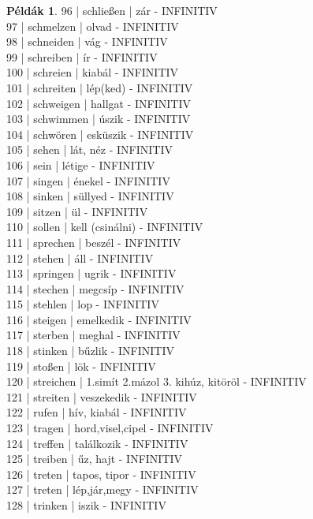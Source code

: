 \documentclass{article}
\theoremstyle{definition}
\newtheorem*{exmp}{Példák}
\begin{document}
\begin{exmp}
96 | schließen | zár - INFINITIV\\
97 | schmelzen | olvad - INFINITIV\\
98 | schneiden | vág - INFINITIV\\
99 | schreiben | ír - INFINITIV\\
100 | schreien | kiabál - INFINITIV\\
101 | schreiten | lép(ked) - INFINITIV\\
102 | schweigen | hallgat - INFINITIV\\
103 | schwimmen | úszik - INFINITIV\\
104 | schwören | esküszik - INFINITIV\\
105 | sehen | lát, néz - INFINITIV\\
106 | sein | létige - INFINITIV\\
107 | singen | énekel - INFINITIV\\
108 | sinken | süllyed - INFINITIV\\
109 | sitzen | ül - INFINITIV\\
110 | sollen | kell (csinálni) - INFINITIV\\
111 | sprechen | beszél - INFINITIV\\
112 | stehen | áll - INFINITIV\\
113 | springen | ugrik - INFINITIV\\
114 | stechen | megcsíp - INFINITIV\\
115 | stehlen | lop - INFINITIV\\
116 | steigen | emelkedik - INFINITIV\\
117 | sterben | meghal - INFINITIV\\
118 | stinken | bűzlik - INFINITIV\\
119 | stoßen | lök - INFINITIV\\
120 | streichen | 1.simít 2.mázol 3. kihúz, kitöröl - INFINITIV\\
121 | streiten | veszekedik - INFINITIV\\
122 | rufen | hív, kiabál - INFINITIV\\
123 | tragen | hord,visel,cipel - INFINITIV\\
124 | treffen | találkozik - INFINITIV\\
125 | treiben | űz, hajt - INFINITIV\\
126 | treten | tapos, tipor - INFINITIV\\
127 | treten | lép,jár,megy - INFINITIV\\
128 | trinken | iszik - INFINITIV\\

\end{exmp}
\end{document}

